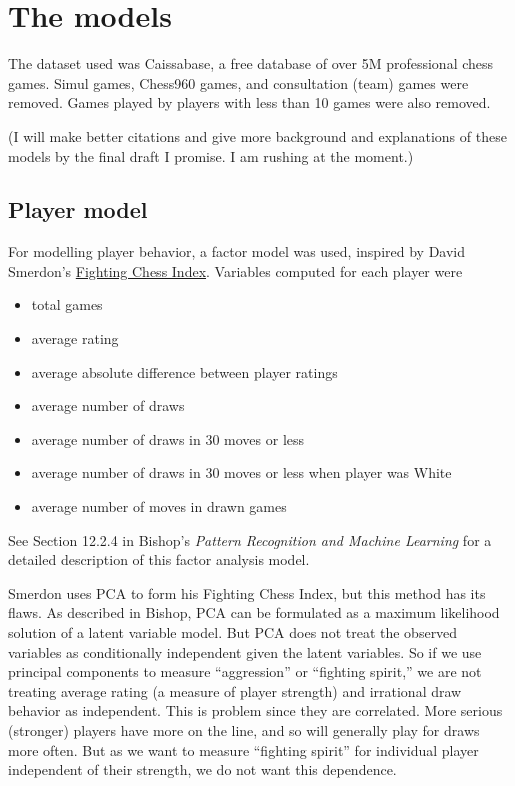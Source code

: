 \documentclass{article}
\begin{document}
\section{The models}
The dataset used was Caissabase, a free database of over 5M professional chess games.
Simul games, Chess960 games, and consultation (team) games were removed.
Games played by players with less than 10 games were also removed.

(I will make better citations and give more background and explanations of these models by the final draft I promise. I am rushing at the moment.)

\subsection{Player model}
For modelling player behavior, a factor model was used, inspired by David Smerdon's
\href{https://www.davidsmerdon.com/?p=2168}{Fighting Chess Index}.
Variables computed for each player were
\begin{itemize}
    \item total games
    \item average rating
    \item average absolute difference between player ratings
    \item average number of draws
    \item average number of draws in 30 moves or less
    \item average number of draws in 30 moves or less when player was White
    \item average number of moves in drawn games
\end{itemize}
See Section 12.2.4 in Bishop's \textit{Pattern Recognition and Machine Learning} for a detailed description of this factor analysis model.

Smerdon uses PCA to form his Fighting Chess Index, but this method has its flaws. As described in Bishop,
PCA can be formulated as a maximum likelihood solution of a latent variable model.
But PCA does not treat the observed variables as conditionally independent given the latent variables.
So if we use principal components to measure ``aggression'' or ``fighting spirit,'' we are not treating
average rating (a measure of player strength) and irrational draw behavior as independent.
This is problem since they are correlated.
More serious (stronger) players have more on the line, and so will generally play for draws more often.
But as we want to measure ``fighting spirit'' for individual player independent of their strength, we do not want this dependence.
\end{document}
